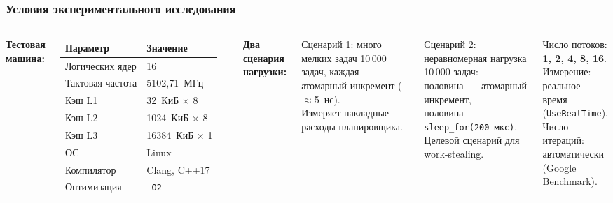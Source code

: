 \documentclass[pdf, hyperref={unicode}, aspectratio=169]{beamer}
\begin{document}
\begin{frame}
\frametitle{Условия экспериментального исследования}

\begin{columns}[T]

\textbf{Тестовая машина:}

\medskip
\begin{tabular}{ll}
\toprule
Параметр & Значение \\
\midrule
Логических ядер & 16 \\
Тактовая частота & 5102{,}71~МГц \\
Кэш L1 & 32~КиБ $\times$ 8 \\
Кэш L2 & 1024~КиБ $\times$ 8 \\
Кэш L3 & 16384~КиБ $\times$ 1 \\
ОС & Linux \\
Компилятор & Clang, C++17 \\
Оптимизация & \texttt{-O2} \\
\bottomrule
\end{tabular}

\textbf{Два сценария нагрузки:}

\begin{block}{Сценарий 1: много мелких задач}
  10\,000 задач, каждая~--- атомарный
  инкремент ($\approx$5~нс).\\
  Измеряет накладные расходы планировщика.
\end{block}

\begin{block}{Сценарий 2: неравномерная нагрузка}
  10\,000 задач: половина~---
  атомарный инкремент,\\
  половина~--- \texttt{sleep\_for(200~мкс)}.\\
  Целевой сценарий для work-stealing.
\end{block}

\medskip
Число потоков: \textbf{1, 2, 4, 8, 16}.\\
Измерение: реальное время (\texttt{UseRealTime}).\\
Число итераций: автоматически (Google Benchmark).

\end{columns}
\end{frame}
\end{document}
